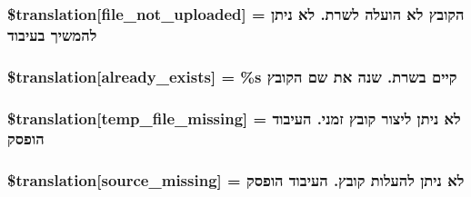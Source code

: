 \subsubsection[{\$translation}]{\setlength{\rightskip}{0pt plus 5cm}\$translation\mbox{[}\textquotesingle{}file\+\_\+not\+\_\+uploaded\textquotesingle{}\mbox{]} = \textquotesingle{}הקובץ לא הועלה לשרת. לא ניתן להמשיך בעיבוד\textquotesingle{}}\label{class_8upload_8he___i_l_8php_a4ce76e7be0b3a03c2b47f6d70c21832e}
\hypertarget{class_8upload_8he___i_l_8php_afd84e910217f04139f567c41e292afa5}{}
\subsubsection[{\$translation}]{\setlength{\rightskip}{0pt plus 5cm}\$translation\mbox{[}\textquotesingle{}already\+\_\+exists\textquotesingle{}\mbox{]} = \textquotesingle{}\%s קיים בשרת. שנה את שם הקובץ\textquotesingle{}}\label{class_8upload_8he___i_l_8php_afd84e910217f04139f567c41e292afa5}
\hypertarget{class_8upload_8he___i_l_8php_ab0fa87a88aba2624004581eed0633325}{}
\subsubsection[{\$translation}]{\setlength{\rightskip}{0pt plus 5cm}\$translation\mbox{[}\textquotesingle{}temp\+\_\+file\+\_\+missing\textquotesingle{}\mbox{]} = \textquotesingle{}לא ניתן ליצור קובץ זמני. העיבוד הופסק\textquotesingle{}}\label{class_8upload_8he___i_l_8php_ab0fa87a88aba2624004581eed0633325}
\hypertarget{class_8upload_8he___i_l_8php_aceaaf7355acaaf10f0ae60378d03c468}{}
\subsubsection[{\$translation}]{\setlength{\rightskip}{0pt plus 5cm}\$translation\mbox{[}\textquotesingle{}source\+\_\+missing\textquotesingle{}\mbox{]} = \textquotesingle{}לא ניתן להעלות קובץ. העיבוד הופסק\textquotesingle{}}\label{class_8upload_8he___i_l_8php_aceaaf7355acaaf10f0ae60378d03c468}
\hypertarget{class_8upload_8he___i_l_8php_aff2427c72a2598aefa6d58df1dd18b08}{}
